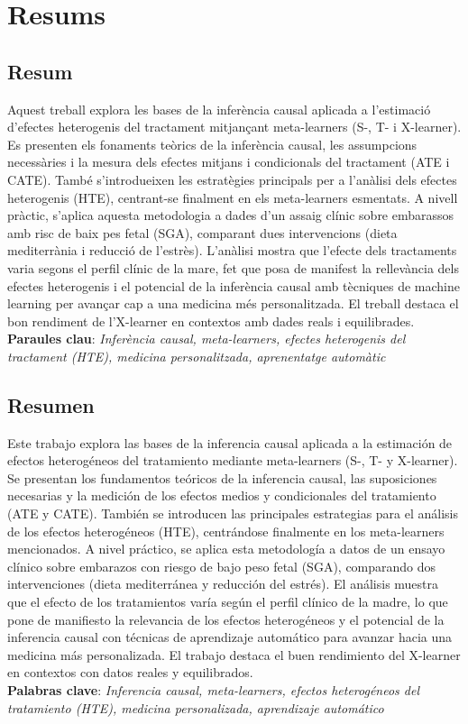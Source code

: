 \documentclass[../../main.tex]{subfiles}
\begin{document}
\chapter*{Resums}\label{ch:abstract} 
\section*{Resum}
Aquest treball explora les bases de la inferència causal aplicada a l'estimació d'efectes heterogenis del tractament mitjançant meta-learners (S-, T- i X-learner). Es presenten els fonaments teòrics de la inferència causal, les assumpcions necessàries i la mesura dels efectes mitjans i condicionals del tractament (ATE i CATE). També s’introdueixen les estratègies principals per a l’anàlisi dels efectes heterogenis (HTE), centrant-se finalment en els meta-learners esmentats. A nivell pràctic, s’aplica aquesta metodologia a dades d’un assaig clínic sobre embarassos amb risc de baix pes fetal (SGA), comparant dues intervencions (dieta mediterrània i reducció de l’estrès). L’anàlisi mostra que l’efecte dels tractaments varia segons el perfil clínic de la mare, fet que posa de manifest la rellevància dels efectes heterogenis i el potencial de la inferència causal amb tècniques de machine learning per avançar cap a una medicina més personalitzada. El treball destaca el bon rendiment de l’X-learner en contextos amb dades reals i equilibrades.
\\
\small \textbf{Paraules clau}: \textit{Inferència causal, meta-learners, efectes heterogenis del tractament (HTE), medicina personalitzada, aprenentatge automàtic}

\section*{Resumen}
Este trabajo explora las bases de la inferencia causal aplicada a la estimación de efectos heterogéneos del tratamiento mediante meta-learners (S-, T- y X-learner). Se presentan los fundamentos teóricos de la inferencia causal, las suposiciones necesarias y la medición de los efectos medios y condicionales del tratamiento (ATE y CATE). También se introducen las principales estrategias para el análisis de los efectos heterogéneos (HTE), centrándose finalmente en los meta-learners mencionados. A nivel práctico, se aplica esta metodología a datos de un ensayo clínico sobre embarazos con riesgo de bajo peso fetal (SGA), comparando dos intervenciones (dieta mediterránea y reducción del estrés). El análisis muestra que el efecto de los tratamientos varía según el perfil clínico de la madre, lo que pone de manifiesto la relevancia de los efectos heterogéneos y el potencial de la inferencia causal con técnicas de aprendizaje automático para avanzar hacia una medicina más personalizada. El trabajo destaca el buen rendimiento del X-learner en contextos con datos reales y equilibrados.
\\
\small\textbf{Palabras clave}: \textit{Inferencia causal, meta-learners, efectos heterogéneos del tratamiento (HTE), medicina personalizada, aprendizaje automático}
\end{document}
